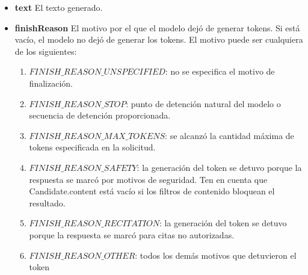 \begin{itemize}
	\item \textbf{text}	El texto generado.
	\item \textbf{finishReason}	El motivo por el que el modelo dejó de generar tokens. Si está vacío, el modelo no dejó de generar los tokens. El motivo puede ser cualquiera de los siguientes:
	\begin{enumerate}
		\item $FINISH\_REASON\_UNSPECIFIED$: no se especifica el motivo de finalización.
		\item $FINISH\_REASON\_STOP$: punto de detención natural del modelo o secuencia de detención proporcionada.
		\item $FINISH\_REASON\_MAX\_TOKENS$: se alcanzó la cantidad máxima de tokens especificada en la solicitud.
		\item $FINISH\_REASON\_SAFETY$: la generación del token se detuvo porque la respuesta se marcó por motivos de seguridad. Ten en cuenta que Candidate.content está vacío si los filtros de contenido bloquean el resultado.
		\item $FINISH\_REASON\_RECITATION$: la generación del token se detuvo porque la respuesta se marcó para citas no autorizadas.
		\item $FINISH\_REASON\_OTHER$: todos los demás motivos que detuvieron el token
	\end{enumerate}
	

\end{itemize}
